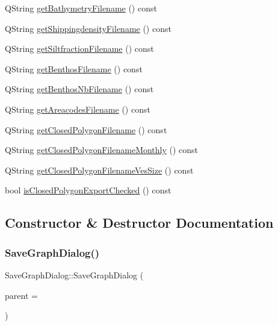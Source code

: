 \begin{DoxyCompactItemize}
Q\+String \mbox{\hyperlink{class_save_graph_dialog_abc34f7fbf9f650c54ee268c31fe9ee3c}{get\+Bathymetry\+Filename}} () const
\item 
Q\+String \mbox{\hyperlink{class_save_graph_dialog_a94de085d1a87a549e95d0ce05b08ba8c}{get\+Shippingdensity\+Filename}} () const
\item 
Q\+String \mbox{\hyperlink{class_save_graph_dialog_afa27957e24618f63d3de50f6e1ddb1c9}{get\+Siltfraction\+Filename}} () const
\item 
Q\+String \mbox{\hyperlink{class_save_graph_dialog_acb5e7cf5fd9e8c43e4c13d6ecbe32320}{get\+Benthos\+Filename}} () const
\item 
Q\+String \mbox{\hyperlink{class_save_graph_dialog_a378c374809ab370203e0864b13bb831f}{get\+Benthos\+Nb\+Filename}} () const
\item 
Q\+String \mbox{\hyperlink{class_save_graph_dialog_a53072988cafea9825f775fcb0a4b95b1}{get\+Areacodes\+Filename}} () const
\item 
Q\+String \mbox{\hyperlink{class_save_graph_dialog_a2b0d759b86546476d443427fa29320b6}{get\+Closed\+Polygon\+Filename}} () const
\item 
Q\+String \mbox{\hyperlink{class_save_graph_dialog_ad2b8607511ed5d0c4a3c5a11afbecf26}{get\+Closed\+Polygon\+Filename\+Monthly}} () const
\item 
Q\+String \mbox{\hyperlink{class_save_graph_dialog_a9c7547e29fe7178c6c78f391333ba007}{get\+Closed\+Polygon\+Filename\+Ves\+Size}} () const
\item 
bool \mbox{\hyperlink{class_save_graph_dialog_a0bb1a02aa6a46d85a33ce800e1157084}{is\+Closed\+Polygon\+Export\+Checked}} () const
\end{DoxyCompactItemize}


\subsection{Constructor \& Destructor Documentation}
\mbox{\label{class_save_graph_dialog_ad9c38de73776a3870cdc6bc6bd9c0c6b}} 
\subsubsection{\texorpdfstring{SaveGraphDialog()}{SaveGraphDialog()}}
{\footnotesize\ttfamily Save\+Graph\+Dialog\+::\+Save\+Graph\+Dialog (\begin{DoxyParamCaption}\item[{Q\+Widget $\ast$}]{parent = {} }\end{DoxyParamCaption})\hspace{0.3cm}{\ttfamily [explicit]}}

